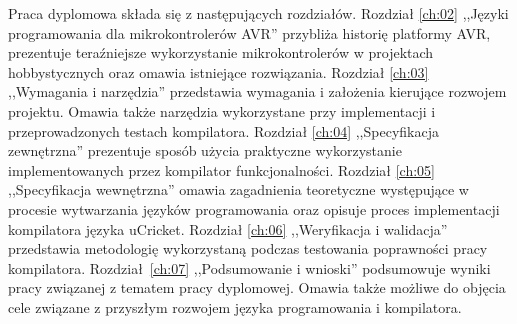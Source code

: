 Praca dyplomowa składa się z następujących rozdziałów. 
Rozdział \ref{ch:02} ,,Języki programowania dla mikrokontrolerów AVR'' przybliża historię platformy AVR, prezentuje teraźniejsze wykorzystanie mikrokontrolerów w projektach hobbystycznych oraz omawia istniejące rozwiązania. 
Rozdział \ref{ch:03} ,,Wymagania i narzędzia'' przedstawia wymagania i założenia kierujące rozwojem projektu. Omawia także narzędzia wykorzystane przy implementacji i przeprowadzonych testach kompilatora. 
Rozdział \ref{ch:04} ,,Specyfikacja zewnętrzna'' prezentuje sposób użycia praktyczne wykorzystanie implementowanych przez kompilator funkcjonalności.
Rozdział \ref{ch:05} ,,Specyfikacja wewnętrzna'' omawia zagadnienia teoretyczne występujące w procesie wytwarzania języków programowania oraz opisuje proces implementacji kompilatora języka uCricket. 
Rozdział \ref{ch:06} ,,Weryfikacja i walidacja'' przedstawia metodologię wykorzystaną podczas testowania poprawności pracy kompilatora. 
Rozdział~\ref{ch:07} ,,Podsumowanie i wnioski'' podsumowuje wyniki pracy związanej z tematem pracy dyplomowej. Omawia także możliwe do objęcia cele związane z przyszłym rozwojem języka programowania i kompilatora.

